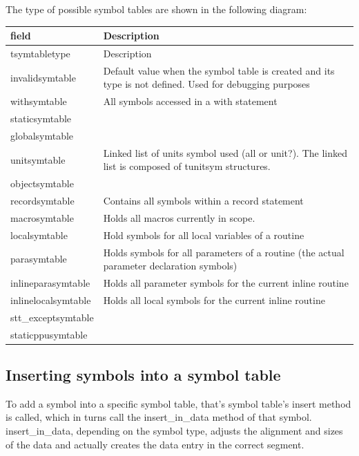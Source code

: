 \documentclass [12pt]{article}
\begin{document}
The type of possible symbol tables are shown in the following diagram:

\begin{longtable}{|l|p{10cm}|}
\hline
field	& Description \\
\hline
\endhead
\hline
\endfoot
tsymtabletype& Description \\
\textsf{invalidsymtable}& 
	Default value when the symbol table is created and its type is not defined. Used for debugging purposes \\
\textsf{withsymtable}& 
	All symbols accessed in a with statement \\
\textsf{staticsymtable}&  \\
\textsf{globalsymtable}&  \\
\textsf{unitsymtable}& 
	Linked list of units symbol used (all or unit?). The linked list is composed of \textsf{tunitsym} structures. \\
\textsf{objectsymtable}&  \\
\textsf{recordsymtable}& 
	Contains all symbols within a record statement \\
\textsf{macrosymtable}& 
	Holds all macros currently in scope. \\
\textsf{localsymtable}& 
	Hold symbols for all local variables of a routine \\
\textsf{parasymtable}& 
	Holds symbols for all parameters of a routine (the actual parameter declaration symbols) \\
\textsf{inlineparasymtable}& 
	Holds all parameter symbols for the current inline routine \\
\textsf{inlinelocalsymtable}& 
	Holds all local symbols for the current inline routine \\
\textsf{stt{\_}exceptsymtable}&  \\
\textsf{staticppusymtable}&  
\label{tab36}
\end{longtable}

\subsection{Inserting symbols into a symbol table}
\label{subsec:inserting}

To add a symbol into a specific symbol table, that's symbol table's 
\textsf{insert} method is called, which in turns call the 
\textsf{insert{\_}in{\_}data} method of that symbol. 
\textsf{insert{\_}in{\_}data}, depending on the symbol type, adjusts the 
alignment and sizes of the data and actually creates the data entry in the 
correct segment.
\end{document}
